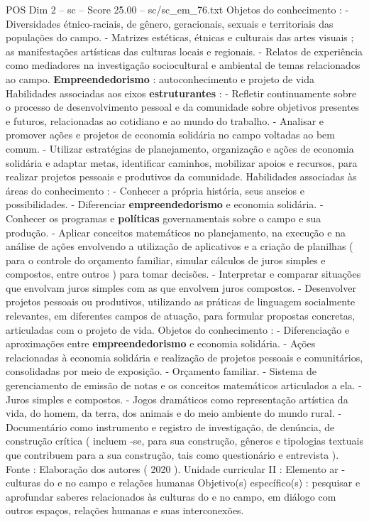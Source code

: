 \begin{textsample}{POS Dim 2 – sc – Score 25.00 – sc/sc\_em\_76.txt}
Objetos do conhecimento : - Diversidades étnico-raciais, de gênero, geracionais, sexuais e territoriais das populações do campo. - Matrizes estéticas, étnicas e culturais das artes visuais ; as manifestações artísticas das culturas locais e regionais. - Relatos de experiência como mediadores na investigação sociocultural e ambiental de temas relacionados ao campo. \textbf{Empreendedorismo} : autoconhecimento e projeto de vida Habilidades associadas aos eixos \textbf{estruturantes} : - Refletir continuamente sobre o processo de desenvolvimento pessoal e da comunidade sobre objetivos presentes e futuros, relacionadas ao cotidiano e ao mundo do trabalho. - Analisar e promover ações e projetos de economia solidária no campo voltadas ao bem comum. - Utilizar estratégias de planejamento, organização e ações de economia solidária e adaptar metas, identificar caminhos, mobilizar apoios e recursos, para realizar projetos pessoais e produtivos da comunidade.
Habilidades associadas às áreas do conhecimento : - Conhecer a própria história, seus anseios e possibilidades. - Diferenciar \textbf{empreendedorismo} e economia solidária. - Conhecer os programas e \textbf{políticas} governamentais sobre o campo e sua produção. - Aplicar conceitos matemáticos no planejamento, na execução e na análise de ações envolvendo a utilização de aplicativos e a criação de planilhas ( para o controle do orçamento familiar, simular cálculos de juros simples e compostos, entre outros ) para tomar decisões. - Interpretar e comparar situações que envolvam juros simples com as que envolvem juros compostos. - Desenvolver projetos pessoais ou produtivos, utilizando as práticas de linguagem socialmente relevantes, em diferentes campos de atuação, para formular propostas concretas, articuladas com o projeto de vida.
Objetos do conhecimento : - Diferenciação e aproximações entre \textbf{empreendedorismo} e economia solidária. - Ações relacionadas à economia solidária e realização de projetos pessoais e comunitários, consolidadas por meio de exposição. - Orçamento familiar. - Sistema de gerenciamento de emissão de notas e os conceitos matemáticos articulados a ela. - Juros simples e compostos. - Jogos dramáticos como representação artística da vida, do homem, da terra, dos animais e do meio ambiente do mundo rural. - Documentário como instrumento e registro de investigação, de denúncia, de construção crítica ( incluem -se, para sua construção, gêneros e tipologias textuais que contribuem para a sua construção, tais como questionário e entrevista ).
Fonte : Elaboração dos autores ( 2020 ).
Unidade curricular II : Elemento ar - culturas do e no campo e relações humanas Objetivo(s) específico(s) : pesquisar e aprofundar saberes relacionados às culturas do e no campo, em diálogo com outros espaços, relações humanas e suas interconexões.

\end{textsample}
